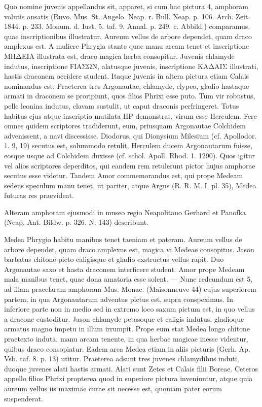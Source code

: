 \documentclass[landscape, a4paper, 11pt, oneside, polutonikogreek, german]{article}
\begin{document}
Quo nomine juvenis appellandus sit, apparet, si cum hac pictura 4, amphoram volutis ansatis (Ruvo. Mus. St. Angelo. Neap. r. Bull. Neap. p. 106. Arch. Zeit. 1844. p. 233. Monum. d. Iust. 5. taf. 9. Annal. p. 249. c. Abbild.) comparamus, quae inscriptionibus illustratur. Aureum vellus de arbore dependet, quam draco amplexus est. A muliere Phrygia stante quae manu arcam tenet et inscriptione ΜΗΔΕΙΑ illustrata est, draco magica herba consopitur. Juvenis chlamyde indutus, inscriptione ϜΙΑΣΩΝ, alatusque juvenis, inscriptione ΚΑΔΑΙΣ illustrati, hastis draconem occidere student. Itaque juvenis in altera pictura etiam Calais nominandus est. Praeterea tres Argonautae, chlamyde, clypeo, gladio hastaque armati in draconem se proripiunt, quos filios Phrixi esse puto. Tum vir robustus, pelle leonina indutus, clavam sustulit, ut caput draconis perfringeret. Totus habitus ejus atque inscriptio mutilata ΗΡ demonstrat, virum esse Herculem. Fere omnes quidem scriptores tradiderunt, eum, priusquam Argonautae Colchidem advenissent, a navi discessisse. Diodorus, qui Dionysium Milesium (cf. Apollodor. 1. 9, 19) secutus est, solummodo retulit, Herculem ducem Argonautarum fuisse, eosque usque ad Colchidem duxisse (cf. schol. Apoll. Rhod. 1. 1290). Quos igitur vel alios scriptores deperditos, qui eandem rem retulerunt pictor hujus amphorae secutus esse videtur. Tandem Amor commemorandus est, qui prope Medeam sedens speculum manu tenet, ut pariter, atque Argus (R. R. M. I. pl. 35), Medea futuras res praevideat.

Alteram amphoram ejusmodi in museo regio Neapolitano Gerhard et Panofka (Neap. Ant. Bildw. p. 326. N. 143) describunt.

Medea Phrygio habitu manibus tenet taeniam et pateram. Aureum vellus de arbore dependet, quam draco amplexus est, magica vi Medeae consopitus. Jason barbatus chitone picto caligisque et gladio exstructus vellus rapit. Duo Argonautae saxo et hasta draconem interficere student. Amor prope Medeam mala manibus tenet, quae dona amatoria esse solent. --- Nunc redeundum est 5, ad illam praeclaram amphoram Mus. Monac. (Maisonneuve 44) cujus superiorem partem, in qua Argonautarum adventus pictus est, supra conspeximus. In inferiore parte non in medio sed in extremo loco saxum pictum est, in quo vellus a dracone custoditur. Jason chlamyde petasoque et caligis indutus, gladioque armatus magno impetu in illum irrumpit. Prope eum stat Medea longo chitone praetexto induta, manu arcam tenente, in qua herbae magicae inesse videntur, quibus draco consopiatur. Eadem arca Medea etiam in aliis picturis (Gerh. Ap. Vsb. taf. 8. p. 13) utitur. Praeterea adsunt tres juvenes chlamydibus induti, duoque juvenes alati hastis armati. Alati sunt Zetes et Calais filii Boreae. Ceteros appello filios Phrixi propterea quod in superiore pictura inveniuntur, atque quia aureum vellus iis maximäe curae sit necesse est, quoniam pater eorum suspenderat.
\end{document}
